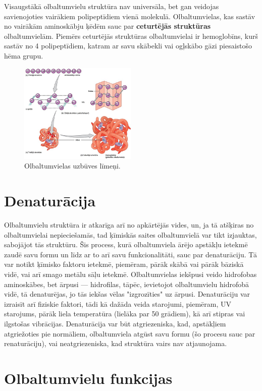 \documentclass[12pt,a4paper]{article}
\begin{document}
Visaugstākā olbaltumvielu struktūra nav universāla, bet gan veidojas savienojoties vairākiem polipeptīdiem vienā molekulā. Olbaltumvielas, kas sastāv no vairākām aminoskābju ķēdēm sauc par \textbf{ceturtējās struktūras} olbaltumvielām. Piemērs ceturtējās struktūras olbaltumvielai ir hemoglobīns, kurš sastāv no 4 polipeptīdiem, katram ar savu skābekli vai ogļskābo gāzi piesaistošo hēma grupu.

\begin{figure}[H]
    \centering
    \includegraphics[width=0.5\textwidth]{atteli/proteīni 4.jpg}
    \caption{Olbaltumvielas uzbūves līmeņi.}
    \label{fig:strukturas}
\end{figure}

\section{Denaturācija}
Olbaltumvielu struktūra ir atkarīga arī no apkārtējās vides, un, ja tā atšķiras no olbaltumvielai nepieciešamās, tad ķīmiskās saites olbaltumvielā var tikt izjauktas, sabojājot tās struktūru. Šis process, kurā olbaltumviela ārējo apstākļu ietekmē zaudē savu formu un līdz ar to arī savu funkcionalitāti, sauc par denaturāciju. Tā var notikt ķīmisko faktoru ietekmē, piemēram, pārāk skābā vai pārāk bāziskā vidē, vai arī smago metālu sāļu ietekmē. Olbaltumvielas iekšpusi veido hidrofobas aminoskābes, bet ārpusi — hidrofilas, tāpēc, ievietojot olbaltumvielu hidrofobā vidē, tā denaturējas, jo tās iekšas vēlas "izgrozīties" uz ārpusi. Denaturāciju var izraisīt arī fiziskie faktori, tādi kā dažāda veida starojumi, piemēram, UV starojums, pārāk liela temperatūra (lielāka par 50 grādiem), kā arī stipras vai ilgstošas vibrācijas. Denaturācija var būt atgriezeniska, kad, apstākļiem atgriežoties pie normāliem, olbaltumviela atgūst savu formu (šo procesu sauc par renaturāciju), vai neatgriezeniska, kad struktūra vairs nav atjaunojama.

\section{Olbaltumvielu funkcijas}
\end{document}
